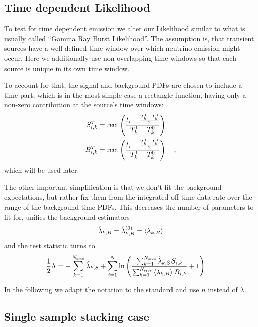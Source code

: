 \subsection{Time dependent Likelihood}
To test for time dependent emission we alter our Likelihood similar to what is usually called \enquote{Gamma Ray Burst Likelihood}.
The assumption is, that transient sources have a well defined time window over which neutrino emission might occur.
Here we additionally use non-overlapping time windows so that each source is unique in its own time window.

To account for that, the signal and background PDFs are chosen to include a time part, which is in the most simple case a rectangle function, having only a non-zero contribution at the source's time windows:
\begin{align}
  S_{i,k}^T &= \operatorname{rect}\left(\frac{t_i - \frac{T_k^1-T_k^0}{2}}
                              {T_k^1-T_k^0}\right) \\
  B_{i,k}^T &= \operatorname{rect}\left(\frac{t_i - \frac{T_k^1-T_k^0}{2}}
                              {T_k^1-T_k^0}\right)
  \quad\text{,}
\end{align}
which will be used later.

The other important simplification is that we don't fit the background expectations, but rather fix them from the integrated off-time data rate over the range of the background time PDFs.
This decreases the number of parameters to fit for, unifies the background estimators
\begin{equation}
  \hat{\lambda}_{k,B} = \hat{\lambda}_{k,B}^{(0)} = \Braket{\lambda_{k,B}}
\end{equation}
and the test statistic turns to
\begin{equation}
  \frac{1}{2}\Lambda
  = -\sum_{k=1}^{N_\text{srcs}}\hat{\lambda}_{k,S} +
    \sum_{i=1}^N \ln\left(
      \frac{\sum_{k=1}^{N_\text{srcs}}\hat{\lambda}_{k,S} S_{i,k}}
           {\sum_{k=1}^{N_\text{srcs}}\Braket{\lambda_{k,B}} B_{i,k}}
      + 1 \right)
  \quad\text{.}
\end{equation}

In the following we adapt the notation to the standard and use $n$ instead of $\lambda$.

\subsection{Single sample stacking case}

